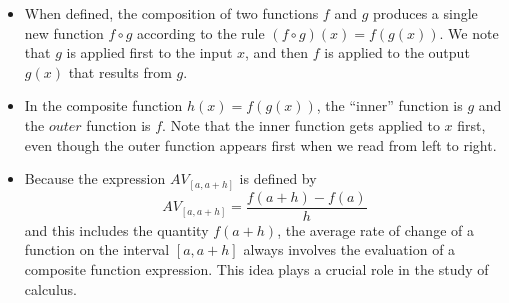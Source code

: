 \documentclass{ximera}
\begin{document}

\begin{summary}\begin{itemize}
\item When defined, the composition of two functions \(f\) and \(g\) produces a single new function \(f \circ g\) according to the rule \((f \circ g)(x) = f(g(x))\).  We note that \(g\) is applied first to the input \(x\), and then \(f\) is applied to the output \(g(x)\) that results from \(g\).
\item In the composite function \(h(x) = f(g(x))\), the ``inner'' function is \(g\) and the \(outer\) function is \(f\).  Note that the inner function gets applied to \(x\) first, even though the outer function appears first when we read from left to right. 
\item Because the expression \(AV_{[a,a+h]}\) is defined by%
\begin{equation*}
AV_{[a,a+h]} = \frac{f(a+h) - f(a)}{h} 
\end{equation*}
and this includes the quantity \(f(a+h)\), the average rate of change of a function on the interval \([a,a+h]\) always involves the evaluation of a composite function expression.  This idea plays a crucial role in the study of calculus.
\end{itemize}\end{summary}
\end{document}
